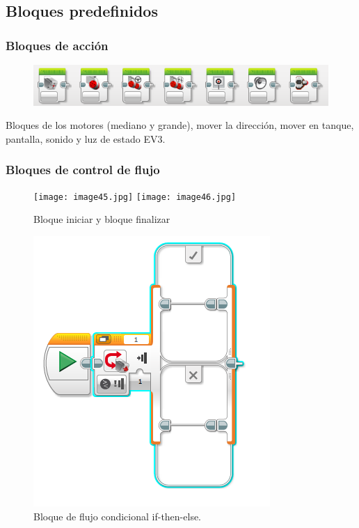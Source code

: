 \documentclass[12pt,a4paper]{article}
\begin{document}
\subsection{Bloques predefinidos}

\subsubsection{Bloques de acción}

\begin{figure}[H]
	\includegraphics[width=\linewidth]{acciones.PNG}
	\centering
\end{figure}

Bloques de los motores (mediano y grande), mover la dirección, mover en tanque,
pantalla, sonido y luz de estado EV3.

\subsubsection{Bloques de control de flujo}

\begin{figure}[H]
	\caption{Bloque iniciar y bloque finalizar}
	\texttt{[image: image45.jpg]}
	\texttt{[image: image46.jpg]}
	\centering
\end{figure}

\begin{figure}[H]
	\caption{Bloque de flujo condicional if-then-else.}
	\includegraphics{condicional.PNG}
	\centering
\end{figure}
\end{document}
